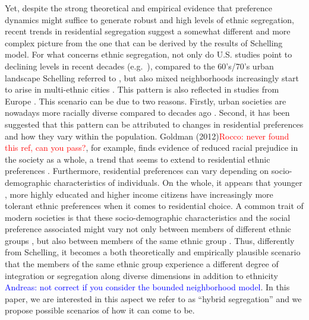 \documentclass[
]{article}
\begin{document}
Yet, despite the strong theoretical and empirical evidence that
preference dynamics might suffice to generate robust and high levels of
ethnic segregation, recent trends in residential segregation suggest a
somewhat different and more complex picture from the one that can be
derived by the results of Schelling model. For what concerns ethnic
segregation, not only do U.S. studies point to declining levels in
recent decades (e.g.~\cite{glaeser2012end}), compared to the 60's/70's
urban landscape \citep{clark2015residential} Schelling referred to
\citep{schelling1969models}, but also mixed neighborhoods increasingly
start to arise in multi-ethnic cities
\citep{clark2015residential, lee2012racial}. This pattern is also
reflected in studies from Europe \citep{blokland2010people}. This
scenario can be due to two reasons. Firstly, urban societies are
nowadays more racially diverse compared to decades ago
\citep{lee2012racial}. Second, it has been suggested that this pattern
can be attributed to changes in residential preferences and how they
vary within the population. Goldman
(2012){\textcolor{red}{Rocco: never found this ref, can you pass?}}, for
example, finds evidence of reduced racial prejudice in the society as a
whole, a trend that seems to extend to residential ethnic preferences
\citep{xie2012modeling}. Furthermore, residential preferences can vary
depending on socio-demographic characteristics of individuals. On the
whole, it appears that younger \citep{clark2018can, clark2009changing},
more highly educated and higher income citizens have increasingly more
tolerant ethnic preferences
\citep{clark2019neighborhood,crowder2012neighborhood,clark2009changing,xie2012modeling}
when it comes to residential choice. A common trait of modern societies
is that these socio-demographic characteristics and the social
preference associated might vary not only between members of different
ethnic groups \citep{clark2009changing,crowder2012neighborhood}, but
also between members of the same ethnic group
\citep{clark2002residential,crul2017upcoming}. Thus, differently from
Schelling, it becomes a both theoretically and empirically plausible
scenario that the members of the same ethnic group experience a
different degree of integration or segregation along diverse dimensions
in addition to ethnicity
\textcolor{blue}{{Andreas: }not correct if you consider the bounded neighborhood model}.
In this paper, we are interested in this aspect we refer to as ``hybrid
segregation'' and we propose possible scenarios of how it can come to
be.
\end{document}
